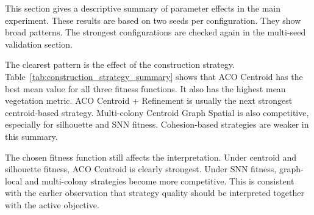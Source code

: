 \documentclass[11pt]{article}
\begin{document}
This section gives a descriptive summary of parameter effects in the main experiment. These results are based on two seeds per configuration. They show broad patterns. The strongest configurations are checked again in the multi-seed validation section.

The clearest pattern is the effect of the construction strategy. Table~\ref{tab:construction_strategy_summary} shows that ACO Centroid has the best mean value for all three fitness functions. It also has the highest mean vegetation metric. ACO Centroid + Refinement is usually the next strongest centroid-based strategy. Multi-colony Centroid Graph Spatial is also competitive, especially for silhouette and SNN fitness. Cohesion-based strategies are weaker in this summary.

The chosen fitness function still affects the interpretation. Under centroid and silhouette fitness, ACO Centroid is clearly strongest. Under SNN fitness, graph-local and multi-colony strategies become more competitive. This is consistent with the earlier observation that strategy quality should be interpreted together with the active objective.

\begin{table}[ht]
\centering
\caption{Construction strategy summary in the main experiment. Fitness values are separated by active objective. The vegetation metric is averaged across all objectives.}
\label{tab:construction_strategy_summary}
\end{table}
\end{document}

